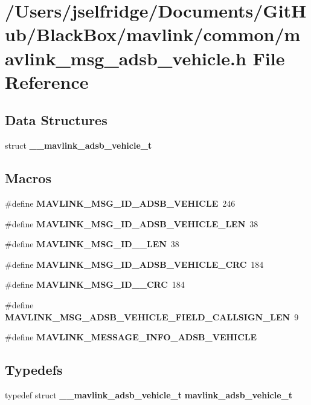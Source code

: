 \section{/\+Users/jselfridge/\+Documents/\+Git\+Hub/\+Black\+Box/mavlink/common/mavlink\+\_\+msg\+\_\+adsb\+\_\+vehicle.h File Reference}
\label{mavlink__msg__adsb__vehicle_8h}
\subsection*{Data Structures}
\begin{DoxyCompactItemize}
\item 
struct \textbf{ \+\_\+\+\_\+mavlink\+\_\+adsb\+\_\+vehicle\+\_\+t}
\end{DoxyCompactItemize}
\subsection*{Macros}
\begin{DoxyCompactItemize}
\item 
\#define \textbf{ M\+A\+V\+L\+I\+N\+K\+\_\+\+M\+S\+G\+\_\+\+I\+D\+\_\+\+A\+D\+S\+B\+\_\+\+V\+E\+H\+I\+C\+LE}~246
\item 
\#define \textbf{ M\+A\+V\+L\+I\+N\+K\+\_\+\+M\+S\+G\+\_\+\+I\+D\+\_\+\+A\+D\+S\+B\+\_\+\+V\+E\+H\+I\+C\+L\+E\+\_\+\+L\+EN}~38
\item 
\#define \textbf{ M\+A\+V\+L\+I\+N\+K\+\_\+\+M\+S\+G\+\_\+\+I\+D\+\_\+\_\+\+L\+EN}~38
\item 
\#define \textbf{ M\+A\+V\+L\+I\+N\+K\+\_\+\+M\+S\+G\+\_\+\+I\+D\+\_\+\+A\+D\+S\+B\+\_\+\+V\+E\+H\+I\+C\+L\+E\+\_\+\+C\+RC}~184
\item 
\#define \textbf{ M\+A\+V\+L\+I\+N\+K\+\_\+\+M\+S\+G\+\_\+\+I\+D\+\_\+\_\+\+C\+RC}~184
\item 
\#define \textbf{ M\+A\+V\+L\+I\+N\+K\+\_\+\+M\+S\+G\+\_\+\+A\+D\+S\+B\+\_\+\+V\+E\+H\+I\+C\+L\+E\+\_\+\+F\+I\+E\+L\+D\+\_\+\+C\+A\+L\+L\+S\+I\+G\+N\+\_\+\+L\+EN}~9
\item 
\#define \textbf{ M\+A\+V\+L\+I\+N\+K\+\_\+\+M\+E\+S\+S\+A\+G\+E\+\_\+\+I\+N\+F\+O\+\_\+\+A\+D\+S\+B\+\_\+\+V\+E\+H\+I\+C\+LE}
\end{DoxyCompactItemize}
\subsection*{Typedefs}
\begin{DoxyCompactItemize}
\item 
typedef struct \textbf{ \+\_\+\+\_\+mavlink\+\_\+adsb\+\_\+vehicle\+\_\+t} \textbf{ mavlink\+\_\+adsb\+\_\+vehicle\+\_\+t}
\end{DoxyCompactItemize}


